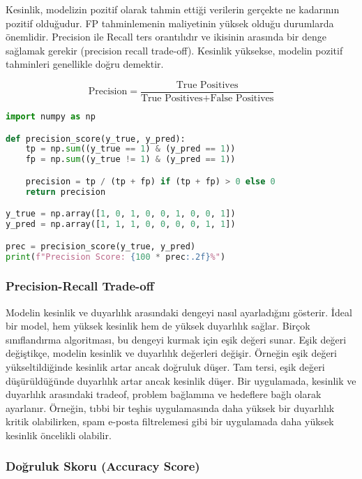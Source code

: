 Kesinlik, modelizin pozitif olarak tahmin ettiği verilerin gerçekte ne kadarının pozitif olduğudur. FP tahminlemenin maliyetinin yüksek olduğu durumlarda önemlidir. Precision ile Recall ters orantılıdır ve ikisinin arasında bir denge sağlamak gerekir (precision recall trade-off). Kesinlik yüksekse, modelin pozitif tahminleri genellikle doğru demektir.

\[\text{Precision} = \frac{\text{True Positives}}{\text{True Positives} + \text{False Positives}}\]

\begin{lstlisting}[language=Python]
import numpy as np

def precision_score(y_true, y_pred):
    tp = np.sum((y_true == 1) & (y_pred == 1))
    fp = np.sum((y_true != 1) & (y_pred == 1))

    precision = tp / (tp + fp) if (tp + fp) > 0 else 0
    return precision

y_true = np.array([1, 0, 1, 0, 0, 1, 0, 0, 1])
y_pred = np.array([1, 1, 1, 0, 0, 0, 0, 1, 1])

prec = precision_score(y_true, y_pred)
print(f"Precision Score: {100 * prec:.2f}%")
\end{lstlisting}

\newpage

\subsubsection{Precision-Recall Trade-off}

Modelin kesinlik ve duyarlılık arasındaki dengeyi nasıl ayarladığını gösterir. İdeal bir model, hem yüksek kesinlik hem de yüksek duyarlılık sağlar. Birçok sınıflandırma algoritması, bu dengeyi kurmak için eşik değeri sunar. Eşik değeri değiştikçe, modelin kesinlik ve duyarlılık değerleri değişir. Örneğin eşik değeri yükseltildiğinde kesinlik artar ancak doğruluk düşer. Tam tersi, eşik değeri düşürüldüğünde duyarlılık artar ancak kesinlik düşer. Bir uygulamada, kesinlik ve duyarlılık arasındaki tradeof, problem bağlamına ve hedeflere bağlı olarak ayarlanır. Örneğin, tıbbi bir teşhis uygulamasında daha yüksek bir duyarlılık kritik olabilirken, spam e-posta filtrelemesi gibi bir uygulamada daha yüksek kesinlik öncelikli olabilir.

\newpage

\subsubsection{Doğruluk Skoru (Accuracy Score)}

